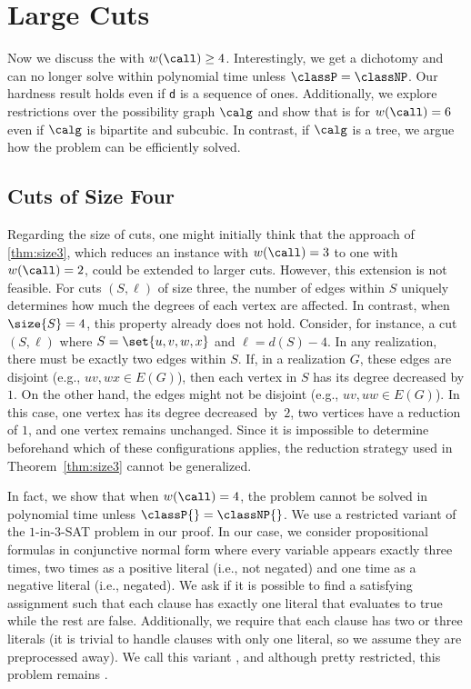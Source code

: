 \section{Large Cuts}
\label{sec:large_cuts}

Now we discuss the \GRC{} with $w(\call) \ge 4$. Interestingly, we get a dichotomy and can no longer solve \GRC{} within polynomial time unless $\classP=\classNP$. Our hardness result holds even if \texttt{d} is a sequence of ones. Additionally, we explore restrictions over the possibility graph $\calg$ and show that \GRC{} is \classNPC{} for $w(\call) = 6$ even if $\calg$ is bipartite and subcubic. In contrast, if $\calg$ is a tree, we argue how the problem can be efficiently solved.


\subsection{Cuts of Size Four}

Regarding the size of cuts, one might initially think that the approach of \cref{thm:size3}, which reduces an instance with $w(\call) = 3$ to one with $w(\call) = 2$, could be extended to larger cuts.
However, this extension is not feasible. For cuts $(S, \ell)$ of size three, the number of edges within $S$ uniquely determines how much the degrees of each vertex are affected. In contrast, when $\size{S} = 4$, this property already does not hold.
%
Consider, for instance, a cut $(S, \ell)$ where $S = \set{u, v, w, x}$ and $\ell = d(S) - 4$. In any realization, there must be exactly two edges within $S$.
If, in a realization $G$, these edges are disjoint (e.g., $uv, wx \in E(G)$), then each vertex in $S$ has its degree decreased by $1$.
%
On the other hand, the edges might not be disjoint (e.g., $uv, uw \in E(G)$). In this case, one vertex has its degree decreased~by~$2$, two vertices have a reduction of $1$, and one vertex remains unchanged.
%
Since it is impossible to determine beforehand which of these configurations applies, the reduction strategy used in Theorem~\ref{thm:size3} cannot be generalized.

In fact, we show that when $w(\call) = 4$, the \GRC{} problem cannot be solved in polynomial time unless $\classP{} = \classNP{}$.
%
We use a restricted variant of the {$1$-in-$3$-SAT} problem \cite{Ga79} in our proof.
%
%
%
In our case, we consider propositional formulas in conjunctive normal form where every variable appears exactly three times, two times as a positive literal (i.e., not negated) and one time as a negative literal (i.e., negated). We ask if it is possible to find a satisfying assignment such that each clause has exactly one literal that evaluates to true while the rest are false.
Additionally, we require that each clause has two or three literals (it is trivial to handle clauses with only one literal, so we assume they are preprocessed away).
We call this variant \rXthreeSAT{}, and although pretty restricted, this problem remains \classNPC{}.

